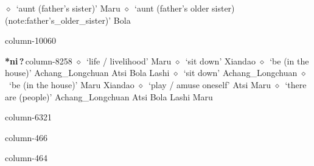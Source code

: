          $\diamond$~`aunt (father's sister)'
         Maru 
\hspace{1ex}
         $\diamond$~`aunt (father's older sister) (note:father's_older_sister)'
         Bola 
  \item {\footnotesize \textbf{}}{\tiny column-10060}
  \item {\footnotesize \textbf{*ni\,?\,}}{\tiny column-8258}
         $\diamond$~`life / livelihood'
         Maru 
\hspace{1ex}
         $\diamond$~`sit down'
         Xiandao 
\hspace{1ex}
         $\diamond$~`be (in the house)'
         Achang\_Longchuan 
\hspace{1ex}
         Atsi 
\hspace{1ex}
         Bola 
\hspace{1ex}
         Lashi 
\hspace{1ex}
         $\diamond$~`sit down'
         Achang\_Longchuan 
\hspace{1ex}
         $\diamond$~`be (in the house)'
         Maru 
\hspace{1ex}
         Xiandao 
\hspace{1ex}
         $\diamond$~`play / amuse oneself'
         Atsi 
\hspace{1ex}
         Maru 
\hspace{1ex}
         $\diamond$~`there are (people)'
         Achang\_Longchuan 
\hspace{1ex}
         Atsi 
\hspace{1ex}
         Bola 
\hspace{1ex}
         Lashi 
\hspace{1ex}
         Maru 
  \item {\footnotesize \textbf{}}{\tiny column-6321}
  \item {\footnotesize \textbf{}}{\tiny column-466}
  \item {\footnotesize \textbf{}}{\tiny column-464}

